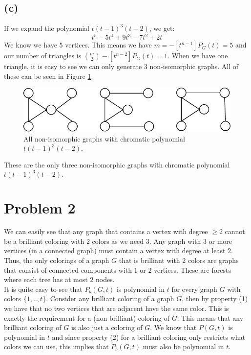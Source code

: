 \documentclass[a4paper]{article}
\begin{document}
\subsection{(c)}
If we expand the polynomial $t(t-1)^3(t-2)$, we get:
$$
t^5-5 t^4+9 t^3-7 t^2+2 t
$$
We know we have $5$ vertices. This means we have $m=-[t^{n-1}]P_G(t)=5$ and our number of triangles is $\binom{m}{2}-[t^{n-2}]P_G(t)=1$. When we have one triangle, it is easy to see we can only generate $3$ non-isomorphic graphs. All of these can be seen in Figure \ref{3}.
\begin{figure}[H]
  \centering
  \captionsetup{justification=centering}
  \includegraphics[width=\textwidth]{fig3.pdf}
  \caption{All non-isomorphic graphs with chromatic polynomial $t(t-1)^3(t-2)$.}
  \label{3}
\end{figure}
These are the only three non-isomorphic graphs with chromatic polynomial $t(t-1)^3(t-2)$.

\section{Problem 2}
We can easily see that any graph that contains a vertex with degree $\geq 2$ cannot be a brilliant coloring with $2$ colors as we need $3$. Any graph with $3$ or more vertices (in a connected graph) must contain a vertex with degree at least $2$. Thus, the only colorings of a graph $G$ that is brilliant with $2$ colors are graphs that consist of connected components with $1$ or $2$ vertices. These are forests where each tree has at most $2$ nodes. \\
It is quite easy to see that $P_b(G, t)$ is polynomial in $t$ for every graph $G$ with colors $\{1,..,t\}$. Consider any brilliant coloring of a graph $G$, then by property (1) we have that no two vertices that are adjacent have the same color. This is exactly the requirement for a (non-brilliant) coloring of $G$. This means that any brilliant coloring of $G$ is also just a coloring of $G$. We know that $P(G, t)$ is polynomial in $t$ and since property (2) for a brilliant coloring only restricts what colors we can use, this implies that $P_b(G, t)$ must also be polynomial in $t$.
\end{document}
